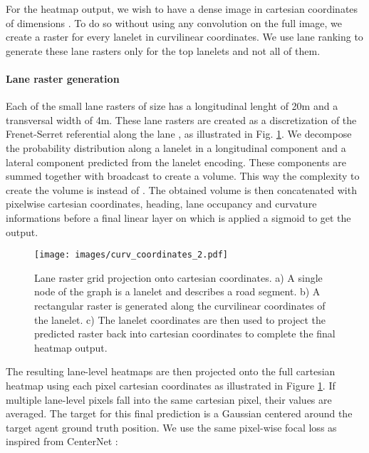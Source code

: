 \documentclass[letterpaper, 10 pt, conference]{ieeeconf}
\begin{document}
For the heatmap output, we wish to have a dense image in cartesian coordinates of dimensions . To do so without using any convolution on the full image, we create a raster for every lanelet in curvilinear coordinates. We use lane ranking to generate these lane rasters only for the top  lanelets and not all of them.





\paragraph{Lane raster generation} Each of the small lane rasters of size  has a longitudinal lenght of 20m and a transversal width of 4m. These lane rasters are created as a discretization of the Frenet-Serret referential along the lane , as illustrated in Fig. \ref{fig:laneraster_proj}.
We decompose the probability distribution along a lanelet in a longitudinal component  and a lateral component  predicted from the lanelet encoding. These components are summed together with broadcast to create a   volume. This way the complexity to create the volume is  instead of . The obtained volume is then concatenated with pixelwise cartesian coordinates, heading, lane occupancy and curvature informations before a final linear layer on which is applied a sigmoid to get the  output.

\begin{figure}[h]
\centerline{\texttt{[image: images/curv\_coordinates\_2.pdf]}}
\caption{Lane raster grid projection onto cartesian coordinates. a) A single node of the graph is a lanelet and describes a road segment. b) A rectangular raster is generated along the curvilinear coordinates of the lanelet. c) The lanelet coordinates are then used to project the predicted raster back into cartesian coordinates to complete the final heatmap output.}
\label{fig:laneraster_proj}
\end{figure}



The resulting lane-level  heatmaps are then projected onto the full cartesian heatmap  using each pixel cartesian coordinates as illustrated in Figure \ref{fig:laneraster_proj}. If multiple lane-level pixels fall into the same cartesian pixel, their values are averaged. The target  for this final prediction  is a Gaussian centered around the target agent ground truth position. We use the same pixel-wise focal loss as \cite{gilles2021home} inspired from CenterNet \cite{zhou2019objects}:
\end{document}
